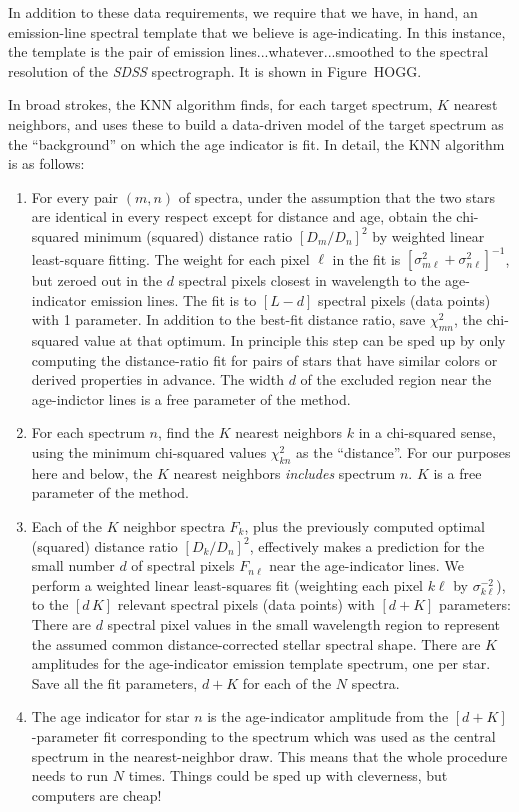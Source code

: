 \documentclass[12pt, preprint]{aastex}
\newcommand{\project}[1]{\textsl{#1}}
\newcommand{\var}{\sigma^{2}}
\newcommand{\invvar}{\sigma^{-2}}
\begin{document}
In addition to these data requirements, we require that we have, in
hand, an emission-line spectral template that we believe is
age-indicating.  In this instance, the template is the pair of
emission lines...whatever...smoothed to the spectral resolution of the
\project{SDSS} spectrograph.  It is shown in Figure~HOGG.

In broad strokes, the KNN algorithm finds, for each target spectrum,
$K$ nearest neighbors, and uses these to build a data-driven model of
the target spectrum as the ``background'' on which the age indicator
is fit.  In detail, the KNN algorithm is as follows:
\begin{enumerate}
\item For every pair $(m, n)$ of spectra, under the assumption that
  the two stars are identical in every respect except for distance and
  age, obtain the chi-squared minimum (squared) distance ratio
  $[D_m/D_n]^2$ by weighted linear least-square fitting.  The weight
  for each pixel $\ell$ in the fit is $[\var_{m\ell} +
    \var_{n\ell}]^{-1}$, but zeroed out in the $d$ spectral pixels
  closest in wavelength to the age-indicator emission lines.  The fit
  is to $[L-d]$ spectral pixels (data points) with 1 parameter.  In
  addition to the best-fit distance ratio, save $\chi^2_{mn}$, the
  chi-squared value at that optimum.  In principle this step can be
  sped up by only computing the distance-ratio fit for pairs of stars
  that have similar colors or derived properties in advance.  The
  width $d$ of the excluded region near the age-indictor lines is a
  free parameter of the method.
\item For each spectrum $n$, find the $K$ nearest neighbors $k$ in a
  chi-squared sense, using the minimum chi-squared values
  $\chi^2_{kn}$ as the ``distance''.  For our purposes here and below,
  the $K$ nearest neighbors \emph{includes} spectrum $n$.  $K$ is a
  free parameter of the method.
\item Each of the $K$ neighbor spectra $F_k$, plus the previously
  computed optimal (squared) distance ratio $[D_k/D_n]^2$, effectively
  makes a prediction for the small number $d$ of spectral pixels
  $F_{n\ell}$ near the age-indicator lines.  We perform a weighted
  linear least-squares fit (weighting each pixel $k\ell$ by
  $\invvar_{k\ell}$), to the $[d\,K]$ relevant spectral pixels (data
  points) with $[d+K]$ parameters: There are $d$ spectral pixel values
  in the small wavelength region to represent the assumed common
  distance-corrected stellar spectral shape.  There are $K$ amplitudes
  for the age-indicator emission template spectrum, one per star.
  Save all the fit parameters, $d+K$ for each of the $N$ spectra.
\item The age indicator for star $n$ is the age-indicator amplitude
  from the $[d+K]$-parameter fit corresponding to the spectrum which
  was used as the central spectrum in the nearest-neighbor draw.  This
  means that the whole procedure needs to run $N$ times.  Things could
  be sped up with cleverness, but computers are cheap!
\end{enumerate}
\end{document}
